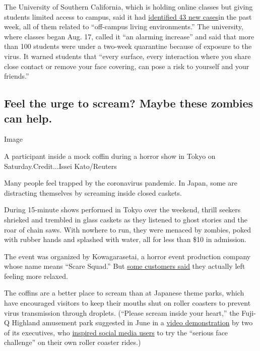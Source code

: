 The University of Southern California, which is holding online classes
but giving students limited access to campus, said it had
\href{https://coronavirus.usc.edu/2020/08/24/8-24-community-health-advisory-covid-19-cases-in-off-campus-residences/}{identified
43 new cases}in the past week, all of them related to ``off-campus
living environments.'' The university, where classes began Aug. 17,
called it ``an alarming increase'' and said that more than 100 students
were under a two-week quarantine because of exposure to the virus. It
warned students that ``every surface, every interaction where you share
close contact or remove your face covering, can pose a risk to yourself
and your friends.''

\hypertarget{feel-the-urge-to-scream-maybe-these-zombies-can-help}{%
\subsection{Feel the urge to scream? Maybe these zombies can
help.}\label{feel-the-urge-to-scream-maybe-these-zombies-can-help}}

Image

A participant inside a mock coffin during a horror show in Tokyo on
Saturday.Credit...Issei Kato/Reuters

Many people feel trapped by the coronavirus pandemic. In Japan, some are
distracting themselves by screaming inside closed caskets.

During 15-minute shows performed in Tokyo over the weekend, thrill
seekers shrieked and trembled in glass caskets as they listened to ghost
stories and the roar of chain saws. With nowhere to run, they were
menaced by zombies, poked with rubber hands and splashed with water, all
for less than \$10 in admission.

The event was organized by Kowagarasetai, a horror event production
company whose name means ``Scare Squad.'' But
\href{https://www.reuters.com/article/us-health-coronavirus-japan-coffins/covid-19-scary-japan-group-offers-coffins-chainsaws-for-stress-relief-idUSKBN25I08Z}{some
customers said} they actually left feeling more relaxed.

The coffins are a better place to scream than at Japanese theme parks,
which have encouraged visitors to keep their mouths shut on roller
coasters to prevent virus transmission through droplets. (``Please
scream inside your heart,'' the Fuji-Q Highland amusement park suggested
in June in a
\href{https://www.youtube.com/watch?v=PMm5QVZ6QeY\&feature=emb_title}{video
demonstration} by two of its executives, who
\href{https://www.wsj.com/articles/reopened-theme-parks-ban-screaming-on-roller-coasters-riders-are-howling-11594222278?st=r6pu4qsoqqsfzlu}{inspired
social media users} to try the ``serious face challenge'' on their own
roller coaster rides.)

